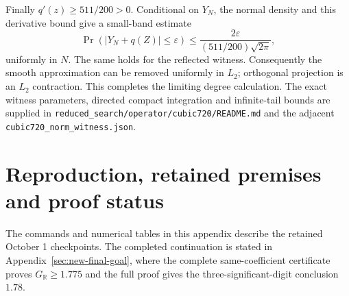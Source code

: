 \documentclass[11pt]{article}
\newcommand{\R}{\mathbb R}
\newcommand{\GR}{G_{\R}}
\begin{document}
Finally $q'(z)\ge511/200>0$. Conditional on $Y_N$, the normal density
and this derivative bound give a small-band estimate
\[
 \Pr(|Y_N+q(Z)|\le\varepsilon)
 \le\frac{2\varepsilon}{(511/200)\sqrt{2\pi}},
\]
uniformly in $N$. The same holds for the reflected witness.
Consequently the smooth approximation can be removed uniformly in
$L_2$; orthogonal projection is an $L_2$ contraction. This completes
the limiting degree calculation. The exact witness parameters,
directed compact integration and infinite-tail bounds are supplied in
\texttt{reduced\_search/operator/cubic720/README.md} and the adjacent
\texttt{cubic720\_norm\_witness.json}.

\section{Reproduction, retained premises and proof status}\label{app:status}
The commands and numerical tables in this appendix describe the retained
October 1 checkpoints. The completed continuation is stated in
Appendix~\ref{sec:new-final-goal}, where the complete same-coefficient
certificate proves $\GR\geq1.775$ and the full proof gives the
three-significant-digit conclusion $1.78$.
\end{document}
